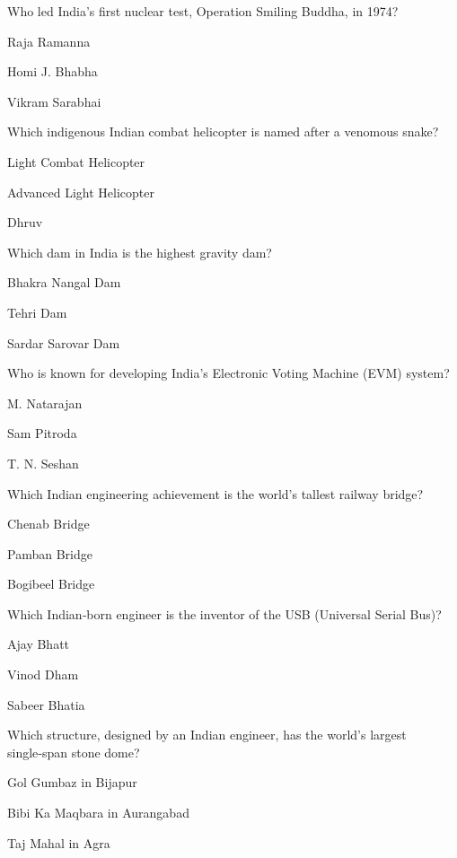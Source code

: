 \begin{enhancedmcq}{Who led India's first nuclear test, Operation Smiling Buddha, in 1974?}
\item Raja Ramanna
\item Homi J. Bhabha
\item Vikram Sarabhai

\end{enhancedmcq}
\begin{enhancedmcq}{Which indigenous Indian combat helicopter is named after a venomous snake?}
\item Light Combat Helicopter
\item Advanced Light Helicopter
\item Dhruv

\end{enhancedmcq}
\begin{enhancedmcq}{Which dam in India is the highest gravity dam?}
\item Bhakra Nangal Dam
\item Tehri Dam
\item Sardar Sarovar Dam

\end{enhancedmcq}
\begin{enhancedmcq}{Who is known for developing India's Electronic Voting Machine (EVM) system?}
\item M. Natarajan
\item Sam Pitroda
\item T. N. Seshan

\end{enhancedmcq}
\begin{enhancedmcq}{Which Indian engineering achievement is the world's tallest railway bridge?}
\item Chenab Bridge
\item Pamban Bridge
\item Bogibeel Bridge

\end{enhancedmcq}
\begin{enhancedmcq}{Which Indian‑born engineer is the inventor of the USB (Universal Serial Bus)?}
\item Ajay Bhatt
\item Vinod Dham
\item Sabeer Bhatia

\end{enhancedmcq}
\begin{enhancedmcq}{Which structure, designed by an Indian engineer, has the world's largest single‑span stone dome?}
\item Gol Gumbaz in Bijapur
\item Bibi Ka Maqbara in Aurangabad
\item Taj Mahal in Agra

\end{enhancedmcq}
